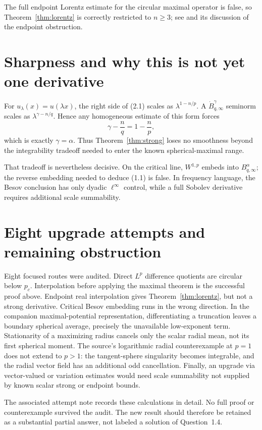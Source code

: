 \documentclass[11pt]{article}
\begin{document}
The full endpoint Lorentz estimate for the circular maximal operator is
false, so Theorem~\ref{thm:lorentz} is correctly restricted to $n\ge3$;
see \cite{STW} and its discussion of the endpoint obstruction.

\section{Sharpness and why this is not yet one derivative}

For $u_\lambda(x)=u(\lambda x)$, the right side of (2.1) scales as
$\lambda^{1-n/p}$.  A $\dot B^\gamma_{q,\infty}$ seminorm scales as
$\lambda^{\gamma-n/q}$.  Hence any homogeneous estimate of this form
forces
\[
 \gamma-\frac nq=1-\frac np,
\]
which is exactly $\gamma=\alpha$.  Thus Theorem~\ref{thm:strong} loses no
smoothness beyond the integrability tradeoff needed to enter the known
spherical-maximal range.

That tradeoff is nevertheless decisive.  On the critical line,
$W^{1,p}$ embeds into $B^\alpha_{q,\infty}$; the reverse embedding needed
to deduce (1.1) is false.  In frequency language, the Besov conclusion has
only dyadic $\ell^\infty$ control, while a full Sobolev derivative requires
additional scale summability.

\section{Eight upgrade attempts and remaining obstruction}

Eight focused routes were audited.  Direct $L^p$ difference quotients are
circular below $p_c$.  Interpolation before applying the maximal theorem is
the successful proof above.  Endpoint real interpolation gives
Theorem~\ref{thm:lorentz}, but not a strong derivative.  Critical Besov
embedding runs in the wrong direction.  In the companion maximal-potential
representation, differentiating a truncation leaves a boundary spherical
average, precisely the unavailable low-exponent term.  Stationarity of a
maximizing radius cancels only the scalar radial mean, not its first
spherical moment.  The source's logarithmic radial counterexample at $p=1$
does not extend to $p>1$: the tangent-sphere singularity becomes integrable,
and the radial vector field has an additional odd cancellation.  Finally,
an upgrade via vector-valued or variation estimates would need scale
summability not supplied by known scalar strong or endpoint bounds.

The associated attempt note records these calculations in detail.  No full
proof or counterexample survived the audit.  The new result should therefore
be retained as a substantial partial answer, not labeled a solution of
Question~1.4.
\end{document}
